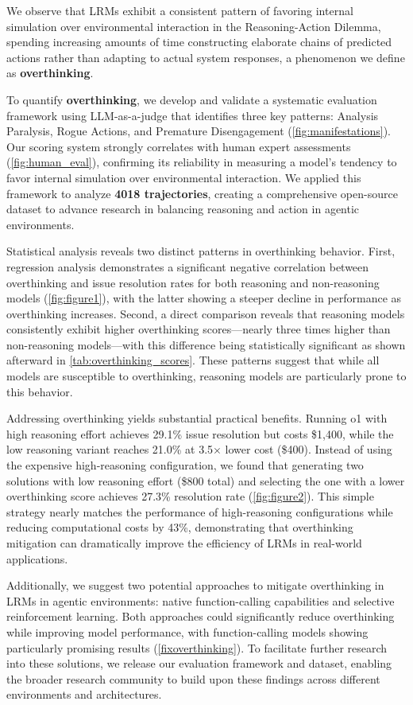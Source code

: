 We observe that LRMs exhibit a consistent pattern of favoring internal simulation over environmental interaction in the Reasoning-Action Dilemma, spending increasing amounts of time constructing elaborate chains of predicted actions rather than adapting to actual system responses, a phenomenon we define as \textbf{overthinking}.

To quantify \textbf{overthinking}, we develop and validate a systematic evaluation framework using LLM-as-a-judge \cite{zheng2023judgingllmasajudgemtbenchchatbot} that identifies three key patterns: Analysis Paralysis, Rogue Actions, and Premature Disengagement (\cref{fig:manifestations}). Our scoring system strongly correlates with human expert assessments (\cref{fig:human_eval}), confirming its reliability in measuring a model's tendency to favor internal simulation over environmental interaction. We applied this framework to analyze \textbf{4018 trajectories}, creating a comprehensive open-source dataset to advance research in balancing reasoning and action in agentic environments.

Statistical analysis reveals two distinct patterns in overthinking behavior. First, regression analysis demonstrates a significant negative correlation between overthinking and issue resolution rates for both reasoning and non-reasoning models (\cref{fig:figure1}), with the latter showing a steeper decline in performance as overthinking increases. Second, a direct comparison reveals that reasoning models consistently exhibit higher overthinking scores—nearly three times higher than non-reasoning models—with this difference being statistically significant as shown 
 afterward in \cref{tab:overthinking_scores}. These patterns suggest that while all models are susceptible to overthinking, reasoning models are particularly prone to this behavior.

Addressing overthinking yields substantial practical benefits. Running o1 with high reasoning effort achieves 29.1\% issue resolution but costs \$1,400, while the low reasoning variant reaches 21.0\% at 3.5$\times$ lower cost (\$400). Instead of using the expensive high-reasoning configuration, we found that generating two solutions with low reasoning effort (\$800 total) and selecting the one with a lower overthinking score achieves 27.3\% resolution rate (\cref{fig:figure2}). This simple strategy nearly matches the performance of high-reasoning configurations while reducing computational costs by 43\%, demonstrating that overthinking mitigation can dramatically improve the efficiency of LRMs in real-world applications.


Additionally, we suggest two potential approaches to mitigate overthinking in LRMs in agentic environments: native function-calling capabilities and selective reinforcement learning. Both approaches could significantly reduce overthinking while improving model performance, with function-calling models showing particularly promising results (\cref{fixoverthinking}). To facilitate further research into these solutions, we release our evaluation framework and dataset, enabling the broader research community to build upon these findings across different environments and architectures.

